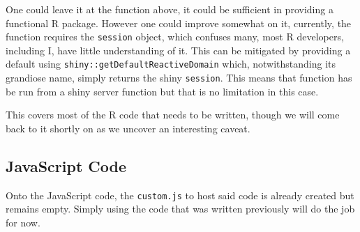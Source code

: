 \documentclass[
]{krantz}
\makeatletter
\newenvironment{Shaded}{\begin{snugshade}}{\end{snugshade}}
\newcommand{\CommentTok}[1]{\textcolor[rgb]{0.37,0.37,0.37}{\textit{#1}}}
\newcommand{\ControlFlowTok}[1]{\textcolor[rgb]{0.27,0.27,0.27}{\textbf{#1}}}
\newcommand{\DataTypeTok}[1]{\textcolor[rgb]{0.27,0.27,0.27}{#1}}
\newcommand{\KeywordTok}[1]{\textcolor[rgb]{0.27,0.27,0.27}{\textbf{#1}}}
\newcommand{\NormalTok}[1]{#1}
\newcommand{\OperatorTok}[1]{\textcolor[rgb]{0.43,0.43,0.43}{\textbf{#1}}}
\newcommand{\StringTok}[1]{\textcolor[rgb]{0.5,0.5,0.5}{#1}}
\newenvironment{kframe}{%
\medskip{}
\setlength{\fboxsep}{.8em}
 \def\at@end@of@kframe{}%
 \ifinner\ifhmode%
  \def\at@end@of@kframe{\end{minipage}}%
  \begin{minipage}{\columnwidth}%
 \fi\fi%
 \def\FrameCommand##1{\hskip\@totalleftmargin \hskip-\fboxsep
 \colorbox{shadecolor}{##1}\hskip-\fboxsep
     \hskip-\linewidth \hskip-\@totalleftmargin \hskip\columnwidth}%
 \MakeFramed {\advance\hsize-\width
   \@totalleftmargin\z@ \linewidth\hsize
   \@setminipage}}%
 {\par\unskip\endMakeFramed%
 \at@end@of@kframe}
\renewenvironment{Shaded}{\begin{kframe}}{\end{kframe}}
\makeatother
\begin{document}
One could leave it at the function above, it could be sufficient in providing a functional R package. However one could improve somewhat on it, currently, the function requires the \texttt{session} object, which confuses many, most R developers, including I, have little understanding of it. This can be mitigated by providing a default using \texttt{shiny::getDefaultReactiveDomain} which, notwithstanding its grandiose name, simply returns the shiny \texttt{session}. This means that function has be run from a shiny server function but that is no limitation in this case.

\begin{Shaded}
\end{Shaded}

This covers most of the R code that needs to be written, though we will come back to it shortly on as we uncover an interesting caveat.

\hypertarget{javascript-code}{%
\subsection*{JavaScript Code}\label{javascript-code}}


Onto the JavaScript code, the \texttt{custom.js} to host said code is already created but remains empty. Simply using the code that was written previously will do the job for now.
\end{document}
